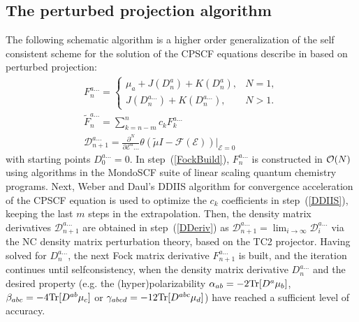 \documentclass[prl,aps,twocolumn,showpacs,twocolumngrid,superbib]{revtex4}
\def\Tr{{\rm Tr}}
\def\F{\mathcal{F}}
\def\D{\mathcal{D}}
\def\E{\mathcal{E}}
\begin{document}
\subsection{The perturbed projection algorithm}

The following schematic algorithm is a higher order generalization of the
self consistent scheme for the solution of the CPSCF equations describe 
in \cite{Weber04} based on perturbed projection:
\begin{subequations}
  \begin{gather}
    F^{a\ldots}_{n}= \left\{
    \begin{array}{ll}
      \mu_a+J(D^{a}_n)+K(D^{a}_n), & N=1\label{FockBuild},\\
      J(D^{a\ldots}_n)+K(D^{a\ldots}_n), & N>1.
    \end{array}\right.\\
    \displaystyle\widetilde{F}^{a\ldots}_{n}=\sum_{k=n-m}^{n}c_k F^{a\ldots}_{k} \label{DDIIS} \\
    \displaystyle\D^{a\ldots}_{n+1}=
    \frac{\partial^N}{\partial\E^a\ldots}\theta(\tilde{\mu}I-
    \F(\E))\bigg|_{\E=0} \label{DDeriv}
  \end{gather} 
\end{subequations}
with starting points $D^{a\ldots}_0=0$. In step~(\ref{FockBuild}),  
$F^{a\ldots}_n$ is constructed in ${\cal O}(N)$ using algorithms 
\cite{MChallacombe97,ESchwegler97} in the {\sc MondoSCF} \cite{MondoSCF} 
suite of linear scaling quantum chemistry programs.  Next,
Weber and Daul's DDIIS algorithm for convergence acceleration 
of the CPSCF equation \cite{Weber_2003} is used to optimize 
the $c_k$ coefficients in step~(\ref{DDIIS}), 
keeping the last $m$ steps in the extrapolation.
Then, the density matrix derivatives $\D^{a\ldots}_{n+1}$ are obtained
in step~(\ref{DDeriv}) as $\D^{a\ldots}_{n+1}=\lim_{i\to\infty}\D^{a\ldots}_i$
via the NC density matrix perturbation theory, based on the TC2
projector. Having solved for $D^{a\ldots}_n$, the next Fock matrix derivative
$F^{a\ldots}_{n+1}$ is built, and the iteration continues until selfconsistency,
when the density matrix derivative $D^{a\ldots}_n$ and the desired property 
(e.g. the (hyper)polarizability $\alpha_{ab}=-2\Tr[D^a\mu_b]$, 
$\beta_{abc}=-4\Tr[D^{ab}\mu_c]$ or $\gamma_{abcd}=-12\Tr[D^{abc}\mu_d]$)
have reached a sufficient level of accuracy.
\end{document}
